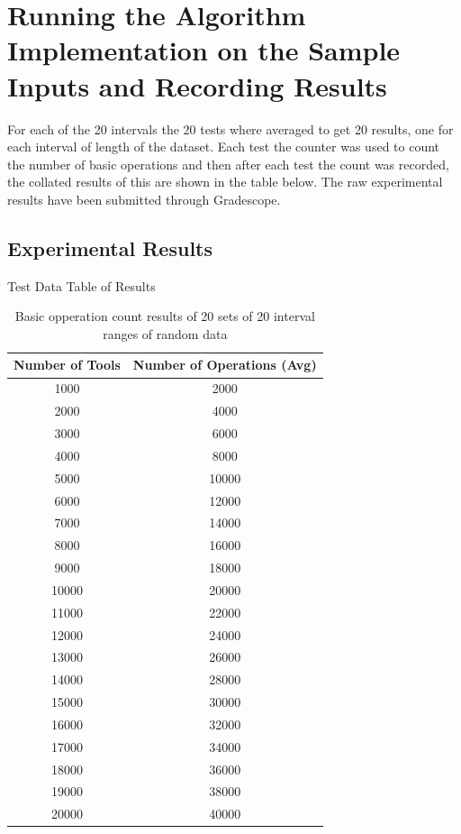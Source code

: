 \documentclass[10pt,a4paper]{report}
\begin{document}
\section{Running the Algorithm Implementation on the Sample Inputs and Recording Results}
For each of the 20 intervals the 20 tests where averaged to get 20 results, one for each interval of length of the dataset. Each test the counter was used to count the number of basic operations and then after each test the count was recorded, the collated results of this are shown in the table below.  The raw experimental results have been submitted through Gradescope. 
\pagebreak 

\subsection{Experimental Results}
Test Data Table of Results

\begin{table}[H]
\centering
\begin{tabular}[1]{cc}
\hline
\textbf{Number of Tools} & \textbf{Number of Operations (Avg)} \\ \hline
1000 & 2000 \\ \hline
2000 & 4000 \\ \hline
3000 & 6000 \\ \hline
4000 & 8000 \\ \hline
5000 & 10000 \\ \hline
6000 & 12000 \\ \hline
7000 & 14000 \\ \hline
8000 & 16000 \\ \hline
9000 & 18000 \\ \hline
10000 & 20000 \\ \hline
11000 & 22000 \\ \hline
12000 & 24000 \\ \hline
13000 & 26000 \\ \hline
14000 & 28000 \\ \hline
15000 & 30000 \\ \hline
16000 & 32000 \\ \hline
17000 & 34000 \\ \hline
18000 & 36000 \\ \hline
19000 & 38000 \\ \hline
20000 & 40000 \\ \hline
\end{tabular}
  \caption{Basic opperation count results of 20 sets of 20 interval ranges of random data}
  \label{fig:basicOpperationCountResults}
\end{table}
\end{document}
